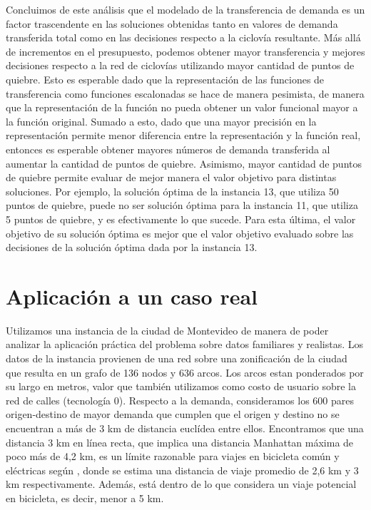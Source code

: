 \FloatBarrier
Concluimos de este análisis que el modelado de la transferencia de demanda es un factor trascendente en las soluciones obtenidas tanto en valores de demanda transferida total como en las decisiones respecto a la ciclovía resultante. Más allá de incrementos en el presupuesto, podemos obtener mayor transferencia y mejores decisiones respecto a la red de ciclovías utilizando mayor cantidad de puntos de quiebre. Esto es esperable dado que la representación de las funciones de transferencia como funciones escalonadas se hace de manera pesimista, de manera que la representación de la función no pueda obtener un valor funcional mayor a la función original. Sumado a esto, dado que una mayor precisión en la representación permite menor diferencia entre la representación y la función real, entonces es esperable obtener mayores números de demanda transferida al aumentar la cantidad de puntos de quiebre. Asimismo, mayor cantidad de puntos de quiebre permite evaluar de mejor manera el valor objetivo para distintas soluciones. Por ejemplo, la solución óptima de la instancia 13, que utiliza 50 puntos de quiebre, puede no ser solución óptima para la instancia 11, que utiliza 5 puntos de quiebre, y es efectivamente lo que sucede. Para esta última, el valor objetivo de su solución óptima es mejor que el valor objetivo evaluado sobre las decisiones de la solución óptima dada por la instancia 13.

\FloatBarrier
\section{Aplicación a un caso real}

Utilizamos una instancia de la ciudad de Montevideo de manera de poder analizar la aplicación práctica del problema sobre datos familiares y realistas. Los datos de la instancia provienen de una red sobre una zonificación de la ciudad que resulta en un grafo de 136 nodos y 636 arcos. Los arcos estan ponderados por su largo en metros, valor que también utilizamos como costo de usuario sobre la red de calles (tecnología 0). Respecto a la demanda, consideramos los 600 pares origen-destino de mayor demanda que cumplen que el origen y destino no se encuentran a más de 3 km de distancia euclídea entre ellos. Encontramos que una distancia 3 km en línea recta, que implica una distancia Manhattan máxima de poco más de 4,2 km, es un límite razonable para viajes en bicicleta común y eléctricas según \textcite{anette2018}, donde se estima una distancia de viaje promedio de 2,6 km y 3 km respectivamente. Además, está dentro de lo que \textcite{shwe2014} considera un viaje potencial en bicicleta, es decir, menor a 5 km.

